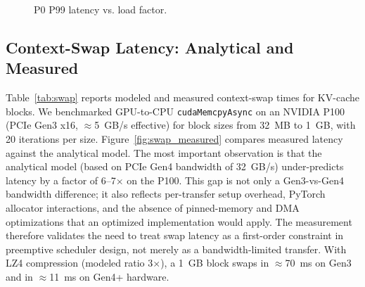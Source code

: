 \documentclass[conference]{IEEEtran}
\begin{document}
\begin{figure}[t]
\centering
\small
{}
\caption{P0 P99 latency vs. load factor.}
\label{fig:loadsweep}
\end{figure}

\subsection{Context-Swap Latency: Analytical and Measured}\label{sec:swap}

Table~\ref{tab:swap} reports modeled and measured context-swap times for KV-cache blocks. We benchmarked GPU-to-CPU \texttt{cudaMemcpyAsync} on an NVIDIA P100 (PCIe Gen3 x16, $\approx$5~GB/s effective) for block sizes from 32~MB to 1~GB, with 20 iterations per size. Figure~\ref{fig:swap_measured} compares measured latency against the analytical model. The most important observation is that the analytical model (based on PCIe Gen4 bandwidth of 32~GB/s) under-predicts latency by a factor of 6--7$\times$ on the P100. This gap is not only a Gen3-vs-Gen4 bandwidth difference; it also reflects per-transfer setup overhead, PyTorch allocator interactions, and the absence of pinned-memory and DMA optimizations that an optimized implementation would apply. The measurement therefore validates the need to treat swap latency as a first-order constraint in preemptive scheduler design, not merely as a bandwidth-limited transfer. With LZ4 compression (modeled ratio 3$\times$), a 1~GB block swaps in $\approx$70~ms on Gen3 and in $\approx$11~ms on Gen4+ hardware.
\end{document}
